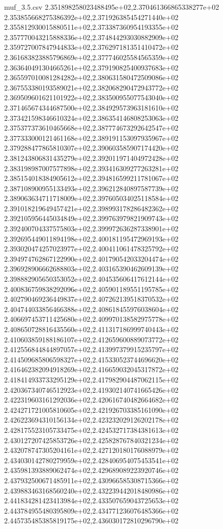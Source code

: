 \begin{filecontents*}{muf_3.5.csv}
2.351898258023488495e+02,2.370461366865338277e+02
2.353855668275386392e+02,2.371926385454271440e+02
2.355812930015880511e+02,2.373387360954193355e+02
2.357770043215888336e+02,2.374844293030882909e+02
2.359727007847944833e+02,2.376297181351410472e+02
2.361683823885796869e+02,2.377746025584565359e+02
2.363640491304665261e+02,2.379190825400937683e+02
2.365597010081284282e+02,2.380631580472509086e+02
2.367553380193589021e+02,2.382068290472943772e+02
2.369509601621101922e+02,2.383500955077543040e+02
2.371465674344687500e+02,2.384929573963181610e+02
2.373421598346610324e+02,2.386354146808253063e+02
2.375377373610465668e+02,2.387774673292642547e+02
2.377333000121461168e+02,2.389191153097935967e+02
2.379288477865810307e+02,2.390603585907174420e+02
2.381243806831435279e+02,2.392011971404972428e+02
2.383198987007577898e+02,2.393416309277263281e+02
2.385154018384905612e+02,2.394816599211781067e+02
2.387108900955133493e+02,2.396212840897587739e+02
2.389063634711718009e+02,2.397605034025118584e+02
2.391018219649457421e+02,2.398993178286482362e+02
2.392105956445034849e+02,2.399763979821909743e+02
2.392400704337575803e+02,2.399972636287338901e+02
2.392695449011894198e+02,2.400181195472969193e+02
2.393020474257023977e+02,2.400411061478325792e+02
2.394974762867122990e+02,2.401790542033204474e+02
2.396928906662688803e+02,2.403165390462609139e+02
2.398882905650353052e+02,2.404535606417612144e+02
2.400836759838292096e+02,2.405901189551195785e+02
2.402790469236449837e+02,2.407262139518370532e+02
2.404744033856466388e+02,2.408618455976038604e+02
2.406697453711425680e+02,2.409970138582975778e+02
2.408650728816435560e+02,2.411317186999740443e+02
2.410603859188186107e+02,2.412659600889073772e+02
2.412556844844897057e+02,2.413997379915235797e+02
2.414509685806598327e+02,2.415330523744696620e+02
2.416462382094918269e+02,2.416659032045317872e+02
2.418414933733295129e+02,2.417982904487062115e+02
2.420367340746512923e+02,2.419302140741665426e+02
2.422319603161292036e+02,2.420616740482664682e+02
2.424271721005810605e+02,2.421926703385161090e+02
2.426223694310156134e+02,2.423232029126202178e+02
2.428175523105733475e+02,2.424532717384381613e+02
2.430127207425853726e+02,2.425828767840321234e+02
2.432078747305204161e+02,2.427120180176088979e+02
2.434030142780279959e+02,2.428406954075453541e+02
2.435981393889062474e+02,2.429689089223920746e+02
2.437932500671485911e+02,2.430966585308715366e+02
2.439883463168560240e+02,2.432239442018480986e+02
2.441834281423413984e+02,2.433507659043725653e+02
2.443784955480395809e+02,2.434771236076485366e+02
2.445735485385819175e+02,2.436030172810296790e+02

\end{filecontents*}
